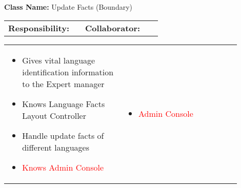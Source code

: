 \begin{cards}[]
    \textbf{Class Name:} Update Facts (Boundary)
    \tcbline
    \begin{tabular}{p{0.45\linewidth} | p{0.45\linewidth}}
        \textbf{Responsibility:}& 
        \textbf{Collaborator:}\\
    \end{tabular}
    \tcbline
    \begin{tabular}{p{0.45\linewidth} | p{0.45\linewidth}}
        \begin{itemize}
            \item Gives vital language identification information to the Expert manager
            \item Knows Language Facts Layout Controller
            \item Handle update facts of different languages
            \item \textcolor{red}{Knows Admin Console}
        \end{itemize}
        &
        \begin{itemize}
            \item \textcolor{red}{Admin Console}
        \end{itemize}
    \end{tabular}
\end{cards}